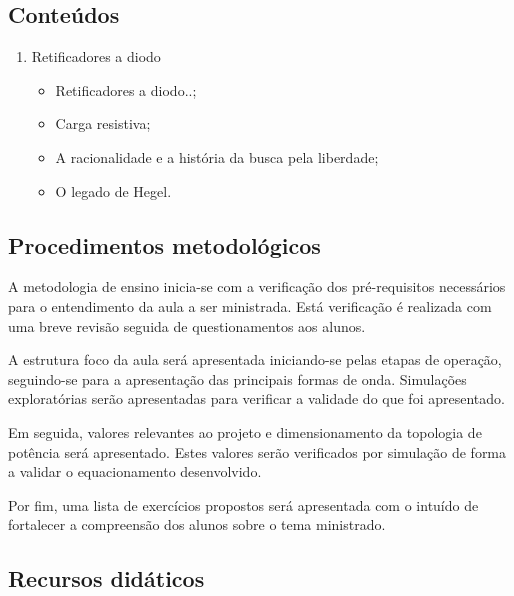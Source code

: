 \documentclass[
	article,			%
	12pt,				%
	twoside,			%
	a4paper,			%
	english,			%
	brazil,				%
	sumario=tradicional
]{abntex2-modelo-plano-de-aula}
\begin{document}
\newpage

\begin{snugshade}
	\section{Conteúdos} %
\end{snugshade}

\begin{enumerate}
	\item Retificadores a diodo
	\begin{itemize}	
		\item Retificadores a diodo..; %
		\item Carga resistiva;
		\item A racionalidade e a história da busca pela liberdade;
		\item O legado de Hegel.	
	\end{itemize}
\end{enumerate}


\begin{snugshade}
	\section{Procedimentos metodológicos} %
\end{snugshade}

A metodologia de ensino inicia-se com a verificação dos pré-requisitos necessários para o entendimento da aula a ser ministrada. Está verificação é realizada com uma breve revisão seguida de questionamentos aos alunos.

A estrutura foco da aula será apresentada iniciando-se pelas etapas de operação, seguindo-se para a apresentação das principais formas de onda. Simulações exploratórias serão apresentadas para verificar a validade do que foi apresentado.

Em seguida, valores relevantes ao projeto e dimensionamento da topologia de potência será apresentado. Estes valores serão verificados por simulação de forma a validar o equacionamento desenvolvido.

Por fim, uma lista de exercícios propostos será apresentada com o intuído de fortalecer a compreensão dos alunos sobre o tema ministrado.

\begin{snugshade}
	\section{Recursos didáticos} %
\end{snugshade}
\end{document}
